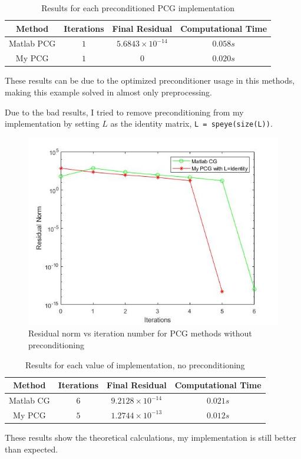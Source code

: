 \documentclass[a4paper, 11pt]{article}
\begin{document}
			\begin{table}[H]
				\centering
				\begin{tabular}{c|c|c|c}
					\textbf{Method} &  \textbf{Iterations} 	& \textbf{Final Residual} 	& \textbf{Computational Time} 	\\ \hline
					Matlab PCG	& 			$1$ 		& $ 5.6843 \times 10^{-14} $ 	& $ 0.058 s $	\\ \hline
					My PCG		& 			$1$ 		& $ 0 $							& $ 0.020 s $	\\ 
				\end{tabular}
				\caption{Results for each preconditioned PCG implementation}
				\label{table:ex3}
			\end{table}
		
			These results can be due to the optimized preconditioner usage in this methods, making this example solved in almost only preprocessing.
			
			Due to the bad results, I tried to remove preconditioning from my implementation by setting $L$ as the identity matrix, \texttt{L = speye(size(L))}.
			\begin{figure}[H]
					\centering
					\includegraphics[width=.6\linewidth]{ex3_NoPrec.jpg}
					\caption{Residual norm vs iteration number for PCG methods without preconditioning}
					\label{fig:ex3_NoPrec}
			\end{figure}
		
			\begin{table}[H]
				\centering
				\begin{tabular}{c|c|c|c}
					\textbf{Method} &  \textbf{Iterations} 	& \textbf{Final Residual} 		& \textbf{Computational Time} 	\\ \hline
					Matlab CG		& 			$6$ 		& $ 9.2128 \times 10^{-14} $ 	& $ 0.021 s $	\\ \hline	
					My PCG 			& 			$5$			& $ 1.2744 \times 10^{-13} $	& $	0.012 s $	\\
				\end{tabular}
				\caption{Results for each value of implementation, no preconditioning}
				\label{table:ex3_NoPrec}
			\end{table}
			These results show the theoretical calculations, my implementation is still better than expected.		
			
\end{document}
